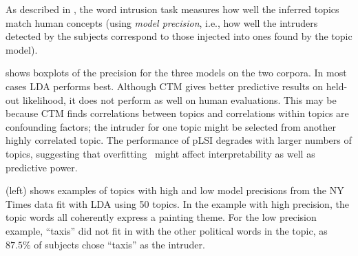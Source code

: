 As described in , the word intrusion task
measures how well the inferred topics match human concepts (using
\emph{model precision}, i.e., how well the intruders detected by the
subjects correspond to those injected into ones found by the topic
model).

 shows boxplots of the precision for the three
models on the two corpora.  In most cases LDA performs best. Although
CTM gives better predictive results on held-out likelihood, it does
not perform as well on human evaluations. This may be because CTM
finds correlations between topics and correlations within topics are
confounding factors; the intruder for one topic might be selected from
another highly correlated topic.  The performance of pLSI degrades
with larger numbers of topics, suggesting that
overfitting~\cite{blei-03} might affect interpretability as well as
predictive power.

 (left) shows examples of topics with high
and low model precisions from the NY Times data fit with LDA using 50
topics. In the example with high precision, the topic words all
coherently express a painting theme.  For the low precision example,
``taxis'' did not fit in with the other political words in the topic,
as $87.5\%$ of subjects chose ``taxis'' as the intruder.



